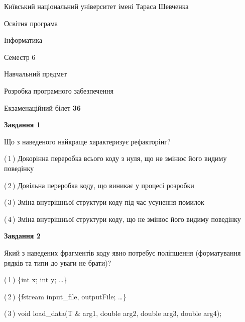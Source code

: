 \documentclass[10pt, ukrainian]{article}
\begin{document}
{{\begin {small}\par
{ \center  Київський національний університет імені Тараса Шевченка \par}
{\parbox {5 cm}{Освітня програма \hfill}{\parbox {7 cm}{Інформатика \hfill}}\parbox {6 cm}{\hfill Семестр 6}}\par
{\parbox {5 cm} {Навчальний предмет \hfill}\parbox {7 cm}{Розробка програмного забезпечення \hfill}\parbox {6cm}{\hfill}\par}\vspace{-7pt} \end{small}}{\center Екзаменаційний білет \No \textbf
{ 36 }\par}}
{
\begin {large}
{\begin {center}\textbf{Завдання 1}\end {center}}\par
Що з наведеного найкраще характеризує рефакторінг?\par
\vspace{2mm}



(\,1\,) Докорінна переробка всього коду з нуля,  що не змінює його видиму поведінку%



(\,2\,) Довільна переробка коду, що виникає у процесі розробки%



(\,3\,) Зміна внутрішньої структури коду під час усунення помилок%



(\,4\,) Зміна внутрішньої структури коду, що не змінює його видиму поведінку%


{\begin {center}\textbf{Завдання 2}\end {center}}\par
Який з наведених фрагментів коду явно потребує поліпшення (форматування рядків та типи до уваги не брати)?\par
\vspace{2mm}



(\,1\,) \{int x; int y; …\}%



(\,2\,) \{fstream input\_file, outputFile; …\}%



(\,3\,) void load\_data(T \& arg1, double arg2, double arg3, double arg4); %




\end{large}}
\end{document}
